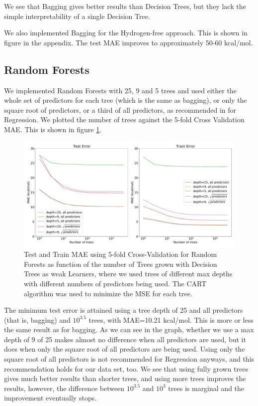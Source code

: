 \documentclass[11pt,a4paper,notitlepage]{article}
\begin{document}
 We see that Bagging gives better results than Decision Trees, but they lack the simple interpretability of a single Decision Tree. 
 
 We also implemented Bagging for the Hydrogen-free approach. This is shown in figure \label{fig:baggingnoH} in the appendix. The test MAE improves to approximately 50-60 kcal/mol. 

\subsection{Random Forests}
We implemented Random Forests with 25, 9 and 5 trees and used either the whole set of predictors for each tree (which is the same as bagging), or only the square root of predictors, or a third of all predictors, as recommended in \citep{hastie} for Regression. We plotted the number of trees against the 5-fold Cross Validation MAE. This is shown in figure \ref{fig:What_about_the_forests?}.
\begin{figure}[H]
\centering
\includegraphics[width=1\textwidth]{forest.pdf}
\caption[Random Forest]{Test and Train MAE using 5-fold Cross-Validation for Random Forests as function of the number of Trees grown with Decision Trees as weak Learners, where we used trees of different max depths with different numbers of predictors being used. The CART algorithm was used to minimize the MSE for each tree.} \label{fig:What_about_the_forests?}
\end{figure}
The minimum test error is attained using a tree depth of 25 and all predictors (that is, bagging) and $10^{3.5}$ trees, with MAE=10.21 kcal/mol. This is more or less the same result as for bagging. As we can see in the graph, whether we use a max depth of 9 of 25 makes almost no difference when all predictors are used, but it does when only the square root of all predictors are being used. Using only the square root of all predictors is not recommended for Regression anyways, and this recommendation holds for our data set, too. We see that using fully grown trees gives much better results than shorter trees, and using more trees improves the results, however, the difference between $10^{3.5}$ and $10^{3}$ trees is marginal and the improvement eventually stops.
\end{document}
